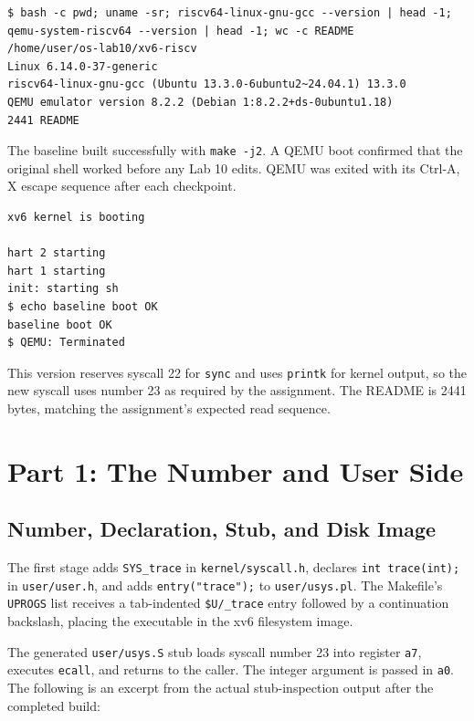 \documentclass[12pt,a4paper]{article}
\begin{document}
\begin{lstlisting}[caption={Working tree, kernel, RISC-V compiler, emulator, and README size}]
$ bash -c pwd; uname -sr; riscv64-linux-gnu-gcc --version | head -1; qemu-system-riscv64 --version | head -1; wc -c README
/home/user/os-lab10/xv6-riscv
Linux 6.14.0-37-generic
riscv64-linux-gnu-gcc (Ubuntu 13.3.0-6ubuntu2~24.04.1) 13.3.0
QEMU emulator version 8.2.2 (Debian 1:8.2.2+ds-0ubuntu1.18)
2441 README
\end{lstlisting}

The baseline built successfully with \texttt{make -j2}. A QEMU boot confirmed that
the original shell worked before any Lab 10 edits. QEMU was exited with its
Ctrl-A, X escape sequence after each checkpoint.

\begin{lstlisting}[caption={Initial boot and shell check; compiler output omitted}]
xv6 kernel is booting

hart 2 starting
hart 1 starting
init: starting sh
$ echo baseline boot OK
baseline boot OK
$ QEMU: Terminated
\end{lstlisting}

This version reserves syscall 22 for \texttt{sync} and uses \texttt{printk} for
kernel output, so the new syscall uses number 23 as required by the assignment.
The README is 2441 bytes, matching the assignment's expected read sequence.

\section{Part 1: The Number and User Side}
\subsection{Number, Declaration, Stub, and Disk Image}
The first stage adds \texttt{SYS\_trace} in \texttt{kernel/syscall.h}, declares
\texttt{int trace(int);} in \texttt{user/user.h}, and adds
\texttt{entry("trace");} to \texttt{user/usys.pl}. The Makefile's
\texttt{UPROGS} list receives a tab-indented \texttt{\$U/\_trace} entry followed
by a continuation backslash, placing the executable in the xv6 filesystem image.

The generated \texttt{user/usys.S} stub loads syscall number 23 into register
\texttt{a7}, executes \texttt{ecall}, and returns to the caller. The integer
argument is passed in \texttt{a0}. The following is an excerpt from the actual
stub-inspection output after the completed build:
\end{document}
